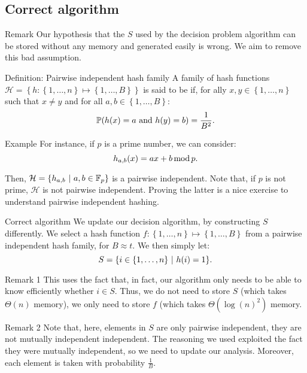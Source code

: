 \documentclass[a4paper]{article}
\begin{document}
\subsection{Correct algorithm}

\begin{parag}{Remark}
    Our hypothesis that the $S$ used by the decision problem algorithm can be stored without any memory and generated easily is wrong. We aim to remove this bad assumption.
\end{parag}

\begin{parag}{Definition: Pairwise independent hash family}
    A family of hash functions $\mathcal{H} = \left\{h: \left\{1, \ldots, n\right\} \mapsto \left\{1, \ldots, B\right\}\right\}$ is said to be  if, for ally $x, y \in \left\{1, \ldots, n\right\}$ such that $x \neq y$ and for all $a, b \in \left\{1, \ldots, B\right\}$: 
    \[\prob\left(h\left(x\right) = a \text{ and } h\left(y\right) = b\right) = \frac{1}{B^2}.\]
    
    \begin{subparag}{Example}
        For instance, if $p$ is a prime number, we can consider: 
        \[h_{a, b}\left(x\right) = ax + b \Mod p.\]

        Then, $\mathcal{H} = \left\{h_{a, b} \suchthat a, b \in \mathbb{F}_p\right\}$ is a pairwise independent. Note that, if $p$ is not prime, $\mathcal{H}$ is not pairwise independent. Proving the latter is a nice exercise to understand pairwise independent hashing.
    \end{subparag}
\end{parag}

\begin{parag}{Correct algorithm}
    We update our decision algorithm, by constructing $S$ differently. We select a hash function $f: \left\{1, \ldots, n\right\} \mapsto \left\{1, \ldots, B\right\}$ from a pairwise independent hash family, for $B \approx t$. We then simply let: 
    \[S = \left\{i \in \left\{1, \ldots, n\right\} \suchthat h\left(i\right) = 1\right\}.\]

    \begin{subparag}{Remark 1}
        This uses the fact that, in fact, our algorithm only needs to be able to know efficiently whether $i \in S$. Thus, we do not need to store $S$ (which takes $\Theta\left(n\right)$ memory), we only need to store $f$ (which takes $\Theta\left(\log\left(n\right)^2\right)$ memory.
    \end{subparag}

    \begin{subparag}{Remark 2}
        Note that, here, elements in $S$ are only pairwise independent, they are not mutually independent independent. The reasoning we used exploited the fact they were mutually independent, so we need to update our analysis. Moreover, each element is taken with probability $\frac{1}{B}$.
    \end{subparag}
\end{parag}
\end{document}
